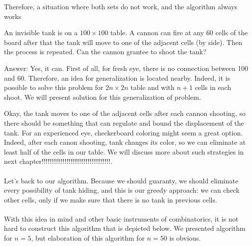 Therefore, a situation where both sets do not work, and the algorithm always works

\begin{example} [239 Olympiad 2017]
    An invisible tank is on a $100 \times 100 $ table. A cannon can fire at any $60$ cells of the board after that the tank will move to one of the adjacent cells (by side). Then the process is repeated. Can the cannon grantee to shoot the tank?
\end{example}
Answer: Yes, it can.
\sol
First of all, for fresh eye, there is no connection between 100 and 60. Therefore, an idea for generalization is located nearby. Indeed, it is possible to solve this problem for $2n\times 2n$ table and with $n+1$ cells in each shoot. We will present solution for this generalization of problem. 

Okay, the tank moves to one of the adjacent cells after each cannon shooting, so there should be something that can regulate and bound the displacement of the tank. For an experienced eye, checkerboard coloring might seem a great option. Indeed, after each canon shooting, tank changes its color, so we can eliminate at least half of the cells in our table. We will discuss more about such strategies in next chapter!!!!!!!!!!!!!!!!!!!!!!!!!!!!!!!!!!!!.
\\\\
Let's back to our algorithm. Because we should guaranty, we should eliminate every possibility of tank hiding, and this is our greedy approach: we can check other cells, only if we make sure that there is no tank in previous cells. 
\\\\
With this idea in mind and other basic instruments of combinatorics, it is not hard to construct this algorithm that is depicted below. We presented algorithm for $n=5$, but elaboration of this algorithm for $n=50$ is obvious. 

